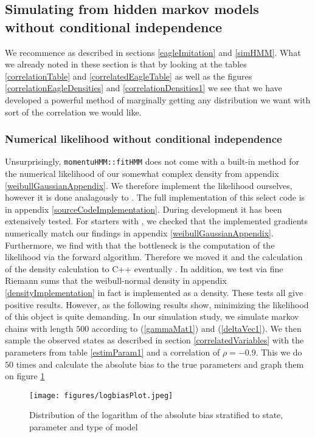 \subsection{Simulating from hidden markov models without conditional independence}
We recommence as described in sections \ref{eagleImitation} and \ref{simHMM}. What we already noted in these section is that by looking at the tables \ref{correlationTable} and \ref{correlatedEagleTable} as well as the figures
\ref{correlationEagleDensities} and \ref{correlationDensities1} we see that we have developed a powerful method of marginally getting any distribution we want with sort of the correlation we would like.
\subsubsection{Numerical likelihood without conditional independence}\label{numericalLikelihoodNoIndepende}
Unsurprisingly, \texttt{momentuHMM::fitHMM} does not come with a built-in method for the numerical likelihood of our somewhat complex density from appendix \ref{weibullGaussianAppendix}. We therefore implement the likelihood ourselves, however it is done analagously to \cite{momentuHMM}. The full implementation of this select code is in appendix \ref{sourceCodeImplementation}. During development it has been extensively tested. For starters with \cite{numDeriv}, we checked that the implemented gradients numerically match our findings in appendix \ref{weibullGaussianAppendix}. Furthermore, we find with \cite{profvis} that the bottleneck is the computation of the likelihood via the forward algorithm. Therefore we moved it and the calculation of the density calculation to C++ eventually \cite{Rcpp}. In addition, we test via fine Riemann sums that the weibull-normal density in appendix \ref{densityImplementation} in fact is implemented as a density. These tests all give positive results. However, as the following results show, minimizing the likelihood of this object is quite demanding. In our simulation study, we simulate markov chains with length $500$ according to (\ref{gammaMat1}) and (\ref{deltaVec1}). We then sample the observed states as described in section \ref{correlatedVariables} with the parameters from table \ref{estimParam1} and a correlation of $\rho = -0.9$. This we do $50$ times and calculate the absolute bias to the true parameters and graph them on figure \ref{logbiasPlot1}
\begin{figure}[ht]
  \centering
  \texttt{[image: figures/logbiasPlot.jpeg]}
  \caption{Distribution of the logarithm of the absolute bias stratified to state, parameter and type of model}
  \label{logbiasPlot1}
\end{figure}\\
